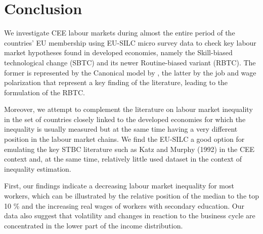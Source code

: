 \documentclass[11pt]{article}
\begin{document}




\section{Conclusion}
We investigate CEE labour markets during almost the entire period of the countries' EU membership using EU-SILC micro survey data to check key labour market hypotheses found in developed economies, namely the Skill-biased technological change (SBTC) and its newer Routine-biased variant (RBTC). The former is represented by the Canonical model by \citet{katz1992changes}, the latter by the job and wage polarization that represent a key finding of the literature, leading to the formulation of the RBTC.

Moreover, we attempt to complement the literature on labour market inequality in the set of countries closely linked to the developed economies for which the inequality is usually measured but at the same time having a very different position in the labour market chains. We find the EU-SILC a good option for emulating the key STBC literature such as Katz and Murphy (1992) in the CEE context and, at the same time, relatively little used dataset in the context of inequality estimation.

First, our findings indicate a decreasing labour market inequality for most workers, which can be illustrated by the relative position of the median to the top 10 \% and the increasing real wages of workers with secondary education. Our data also suggest that volatility and changes in reaction to the business cycle are concentrated in the lower part of the income distribution.
\end{document}
